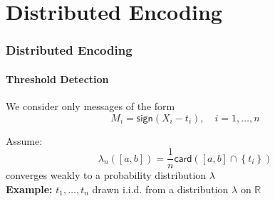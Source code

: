\documentclass[mathserif]{beamer}
\newcommand{\sgn}{\mathsf{sign}}
\newcommand{\unif}{\mathsf{unif}}
\begin{document}

\section{Distributed Encoding}

\begin{frame}
\frametitle{Distributed Encoding}
\framesubtitle{Threshold Detection}
We consider only messages of the form
\[
M_i = \sgn(X_i - t_i),\quad i=1,\ldots,n
\]
\begin{center}
\pause
{}
\end{center}
Assume:
\[
\lambda_n([a,b]) = \frac{1}{n} \mathsf{card}\left( [a,b]  \cap \left\{t_i \right\} \right)
\]
converges weakly to a probability distribution $\lambda$
\\
\bigskip
\pause
\textbf{Example:} $t_1,\ldots,t_n$ drawn i.i.d. from a distribution $\lambda$ on $\mathbb R$ 

\end{frame}
\end{document}
